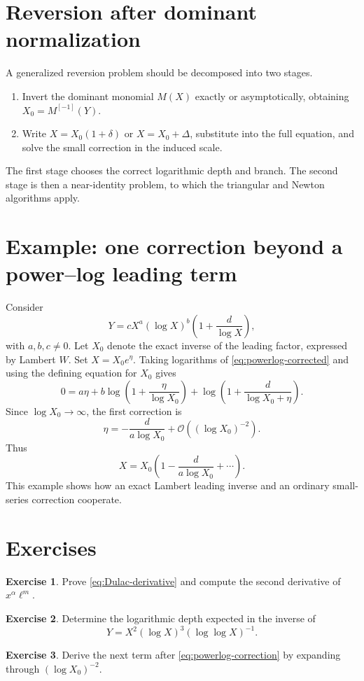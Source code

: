 \documentclass[11pt,openany]{book}
\theoremstyle{definition}
\newtheorem{exercise}{Exercise}[chapter]
\theoremstyle{plain}
\theoremstyle{remark}
\newcommand{\bigO}{\mathcal{O}}
\newcommand{\invcomp}{^{[-1]}}
\begin{document}
\section{Reversion after dominant normalization}
A generalized reversion problem should be decomposed into two stages.
\begin{enumerate}
\item Invert the dominant monomial \(M(X)\) exactly or asymptotically, obtaining \(X_0=M\invcomp(Y)\).
\item Write \(X=X_0(1+\delta)\) or \(X=X_0+\Delta\), substitute into the full equation, and solve the small correction in the induced scale.
\end{enumerate}
The first stage chooses the correct logarithmic depth and branch. The second stage is then a near-identity problem, to which the triangular and Newton algorithms apply.

\section{Example: one correction beyond a power--log leading term}
Consider
\begin{equation}\label{eq:powerlog-corrected}
 Y=cX^a(\log X)^b\left(1+\frac{d}{\log X}\right),
\end{equation}
with \(a,b,c\ne0\). Let \(X_0\) denote the exact inverse of the leading factor, expressed by Lambert \(W\). Set \(X=X_0e^\eta\). Taking logarithms of \cref{eq:powerlog-corrected} and using the defining equation for \(X_0\) gives
\[
 0=a\eta+b\log\left(1+\frac{\eta}{\log X_0}\right)
 +\log\left(1+\frac{d}{\log X_0+\eta}\right).
\]
Since \(\log X_0\to\infty\), the first correction is
\begin{equation}\label{eq:powerlog-correction}
 \eta=-\frac{d}{a\log X_0}+\bigO\left((\log X_0)^{-2}\right).
\end{equation}
Thus
\[
 X=X_0\left(1-\frac{d}{a\log X_0}+\cdots\right).
\]
This example shows how an exact Lambert leading inverse and an ordinary small-series correction cooperate.

\section{Exercises}
\begin{exercise}
Prove \cref{eq:Dulac-derivative} and compute the second derivative of \(x^\alpha\ell^m\).
\end{exercise}
\begin{exercise}
Determine the logarithmic depth expected in the inverse of
\[
 Y=X^2(\log X)^3(\log\log X)^{-1}.
\]
\end{exercise}
\begin{exercise}
Derive the next term after \cref{eq:powerlog-correction} by expanding through \((\log X_0)^{-2}\).
\end{exercise}
\end{document}
